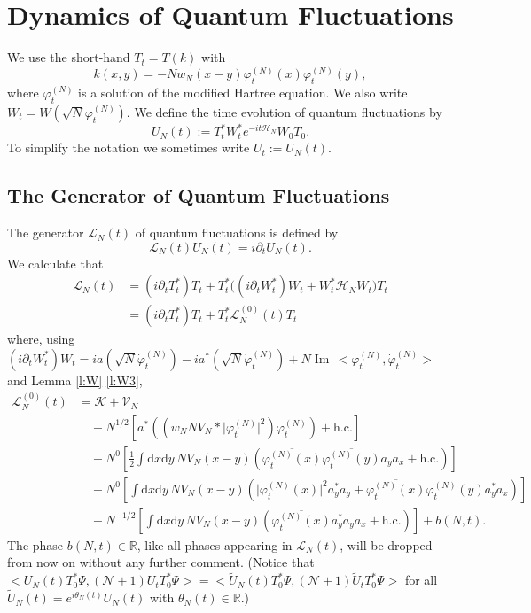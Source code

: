 \documentclass[11pt,a4paper,draft,DIV11]{scrartcl}	%
\newcommand{\di}{\textrm{d}}		%
\newcommand{\Lcal}{\mathcal{L}}		%
\newcommand{\Ncal}{\mathcal{N}}		%
\newcommand{\Kcal}{\mathcal{K}}		%
\newcommand{\Vcal}{\mathcal{V}}		%
\newcommand{\Hcal}{\mathcal{H}}		%
\newcommand{\hc}{\mbox{h.c.}}		%
\newcommand{\scal}[2]{\big<#1,#2\big>} %
\newcommand{\cc}[1]{\overline{#1}}	%
\newcommand{\Rbb}{\mathbb{R}}		%
\renewcommand{\Im}{\operatorname{Im}\,} 	%
\newcommand{\ph}{\varphi_t^{(N)}}	%
\newcommand{\phdot}{\dot{\varphi}_t^{(N)}}	%
\newcommand{\be}[1]{\begin{equation}\label{eq:#1}}	%
\newcommand{\ee}{\end{equation}}
\newcommand{\bd}{\begin{displaymath}}			%
\newcommand{\ed}{\end{displaymath}}
\begin{document}
\section{Dynamics of Quantum Fluctuations}
We use the short-hand $T_t = T(k)$ with
\bd
k(x,y) = - N w_N(x-y) \ph(x) \ph(y),
\ed
where $\ph$ is a solution of the modified Hartree equation. We also write $W_t = W(\sqrt{N}\ph)$.
We define the time evolution of quantum fluctuations by
\bd
U_N(t) := T^\ast_t W^\ast_t e^{-it \Hcal_N} W_0 T_0.
\ed
To simplify the notation we sometimes write $U_t := U_N(t)$.

\subsection{The Generator of Quantum Fluctuations}
The generator $\Lcal_N(t)$ of quantum fluctuations is defined by
\bd
\Lcal_N(t) U_N(t) = i \partial_t U_N(t).
\ed
We calculate that
\begin{align*}
\Lcal_N(t) 	& = (i \partial_t T^*_t) T_t + T^*_t \big( (i \partial_t W^*_t) W_t + W^*_t \Hcal_N W_t \big) T_t \\
		& = (i \partial_t T^*_t) T_t + T^*_t \Lcal^{(0)}_N(t) T_t
\end{align*}
where, using $(i \partial_t W^*_t) W_t = i a(\sqrt{N} \phdot) - i a^\ast(\sqrt{N}\phdot) + N \Im \scal{\ph}{\phdot}$ and Lemma \ref{l:W} \ref{l:W3},
\be{no3}
\begin{split}
\Lcal^{(0)}_N(t) & = \Kcal + \Vcal_N \\
		& \quad + N^{1/2} \left[  a^*\left( (w_N N V_N \ast \lvert \ph \rvert^2)\ph \right) + \hc  \right] \\
		& \quad + N^0	    \left[  \frac{1}{2}\int \di x \di y\, NV_N(x-y)\left( \cc{\ph(x)} \cc{\ph(y)} a_y a_x + \hc \right) \right] \\
		& \quad + N^0	    \left[  \int \di x \di y\, NV_N(x-y)\left( \lvert \ph(x) \rvert^2 a^*_y a_y + \cc{\ph(x)} \ph(y) a^*_y a_x \right) \right] \\
		& \quad + N^{-1/2}\left[  \int \di x \di y\, NV_N(x-y) \left( \cc{\ph(x)} a^*_y a_y a_x + \hc \right)  \right] + b(N,t).
\end{split}
\ee
The phase $b(N,t) \in \Rbb$, like all phases appearing in $\Lcal_N(t)$, will be dropped from now on without any further comment. (Notice that $\scal{U_N(t)T^\ast_0 \Psi}{(\Ncal+1)U_t T_0^\ast \Psi} = \scal{\tilde U_N(t)T^\ast_0 \Psi}{(\Ncal+1)\tilde U_t T_0^\ast \Psi}$ for all $\tilde U_N(t) = e^{i\theta_N(t)} U_N(t)$ with $\theta_N(t) \in \Rbb$.)
\end{document}
